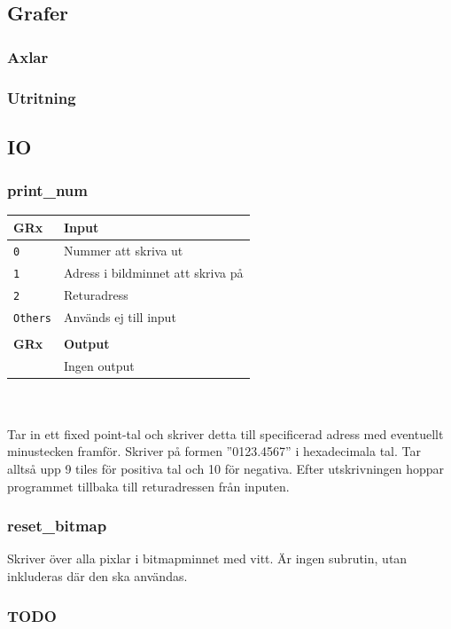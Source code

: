 \documentclass[]{article}
\begin{document}
\subsection{Grafer}
\subsubsection{Axlar}
\subsubsection{Utritning}

\subsection{IO}
\subsubsection{print\_num}
\begin{tabular}{ll}
	\textbf{GRx}    & \textbf{Input}                    \\ \hline
	\texttt{0}      & Nummer att skriva ut              \\
	\texttt{1}      & Adress i bildminnet att skriva på \\
	\texttt{2}      & Returadress                       \\
	\texttt{Others} & Används ej till input             \\
	                &  \\
	\textbf{GRx}    & \textbf{Output}                   \\ \hline
	                & Ingen output 						\\
\end{tabular}
\\\\
\noindent
Tar in ett fixed point-tal och skriver detta till specificerad adress med eventuellt minustecken framför. Skriver på formen ''0123.4567'' i hexadecimala tal. Tar alltså upp 9 tiles för positiva tal och 10 för negativa. Efter utskrivningen hoppar programmet tillbaka till returadressen från inputen.

\subsubsection{reset\_bitmap}
Skriver över alla pixlar i bitmapminnet med vitt. Är ingen subrutin, utan inkluderas där den ska användas.

\subsubsection{TODO}
\end{document}
